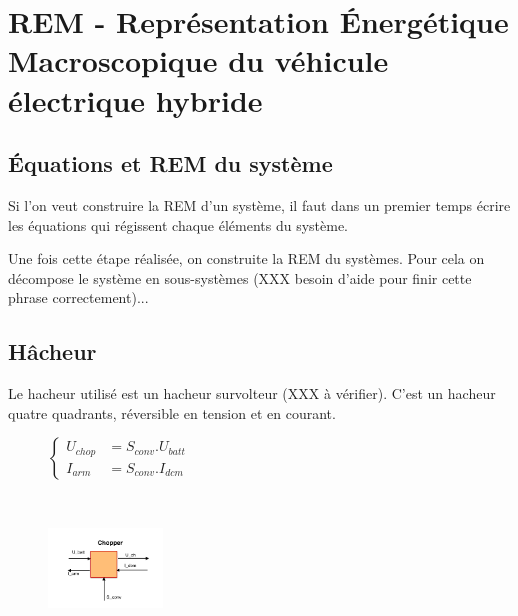 \section{REM - Représentation \'Energétique Macroscopique du véhicule électrique hybride}

\subsection{Équations et REM du système}

Si l'on veut construire la REM d'un système, il faut dans un premier temps écrire les équations qui régissent chaque éléments du système. 

Une fois cette étape réalisée, on construite la REM du systèmes. Pour cela on décompose le système en sous-systèmes (XXX besoin d'aide pour finir cette phrase correctement)...

\subsection{Hâcheur}
Le hacheur utilisé est un hacheur survolteur (XXX à vérifier). C'est un hacheur quatre quadrants, réversible en tension et en courant.  
\vspace{-10px}
\begin{figure}[ht]
\centering
\begin{minipage}{.5\textwidth}  
\centering
$\begin{cases}
	 U_{chop} &= S_{conv}.U_{batt}\\
	I_{arm} &= S_{conv}.I_{dcm}
\end{cases}$
\end{minipage}~
\begin{minipage}{.5\textwidth}
  \centering
\includegraphics[height=80px]{images/Chopper.png}
\end{minipage}
\end{figure}
\FloatBarrier
\vspace{-20px}

